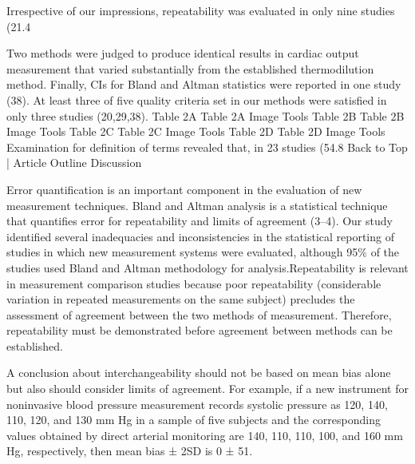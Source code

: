 \documentclass[]{article}
\begin{document}
Irrespective of our impressions, repeatability was evaluated in only nine studies (21.4%

Two methods were judged to produce identical results in cardiac output measurement that varied substantially from the established thermodilution method. Finally, CIs for Bland and Altman statistics were reported in one study (38). At least three of five quality criteria set in our methods were satisfied in only three studies (20,29,38).
Table 2A
Table 2A
Image Tools	Table 2B
Table 2B
Image Tools	Table 2C
Table 2C
Image Tools
Table 2D
Table 2D
Image Tools
Examination for definition of terms revealed that, in 23 studies (54.8%
Back to Top | Article Outline
Discussion

Error quantification is an important component in the evaluation of new measurement techniques. Bland and Altman analysis is a statistical technique that quantifies error for repeatability and limits of agreement (3–4). Our study identified several inadequacies and inconsistencies in the statistical reporting of studies in which new measurement systems were evaluated, although 95\% of the studies used Bland and Altman methodology for analysis.Repeatability is relevant in measurement comparison studies because poor repeatability (considerable variation in repeated measurements on the same subject) precludes the assessment of agreement between the two methods of measurement. Therefore, repeatability must be demonstrated before agreement between methods can be established.

A conclusion about interchangeability should not be based on mean bias alone but also should consider limits of agreement. For example, if a new instrument for noninvasive blood pressure measurement records systolic pressure as 120, 140, 110, 120, and 130 mm Hg in a sample of five subjects and the corresponding values obtained by direct arterial monitoring are 140, 110, 110, 100, and 160 mm Hg, respectively, then mean bias ± 2SD is 0 ± 51. 
\end{document}
